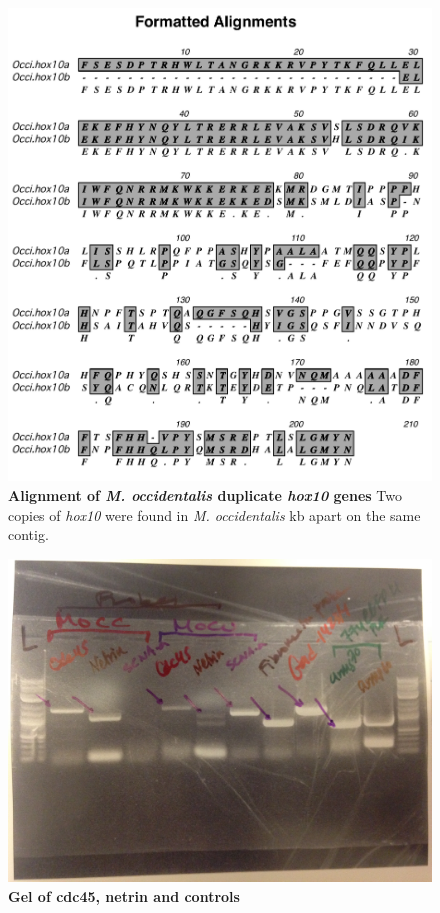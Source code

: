 \begin{figure}[tbp]
\centering
\includegraphics[scale=0.95]{figures/Occi_hox10.pdf}
\caption{\textbf{Alignment of \textit{M. occidentalis} duplicate \textit{hox10} genes} Two copies of \textit{hox10} were found in \textit{M. occidentalis}  kb apart on the same contig.}
\label{fig:occihox10}
\end{figure}

\begin{figure}[tbp]
\centering
\includegraphics[scale=0.10]{figures/gel.jpg}
\caption{\textbf{Gel of cdc45, netrin and controls} }
\label{fig:gel}
\end{figure}


